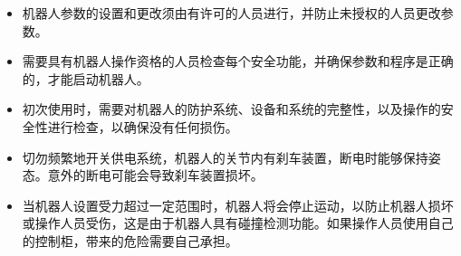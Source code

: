 \documentclass[a4paper,11pt,english,openany,oneside]{sphinxmanual}
\begin{document}
\begin{savenotes}
\begin{tabular}[t]{}
\begin{varwidth}[t]{}
\begin{itemize}
\item {} 
\sphinxAtStartPar
机器人参数的设置和更改须由有许可的人员进行，并防止未授权的人员更改参数。

\item {} 
\sphinxAtStartPar
需要具有机器人操作资格的人员检查每个安全功能，并确保参数和程序是正确的，才能启动机器人。

\item {} 
\sphinxAtStartPar
初次使用时，需要对机器人的防护系统、设备和系统的完整性，以及操作的安全性进行检查，以确保没有任何损伤。

\item {} 
\sphinxAtStartPar
切勿频繁地开关供电系统，机器人的关节内有刹车装置，断电时能够保持姿态。意外的断电可能会导致刹车装置损坏。

\item {} 
\sphinxAtStartPar
当机器人设置受力超过一定范围时，机器人将会停止运动，以防止机器人损坏或操作人员受伤，这是由于机器人具有碰撞检测功能。如果操作人员使用自己的控制柜，带来的危险需要自己承担。

\end{itemize}
\sphinxbeforeendvarwidth
\end{varwidth}%
\\
\sphinxbottomrule
\end{tabular}
\sphinxtableafterendhook\par
\sphinxattableend\end{savenotes}
\end{document}
